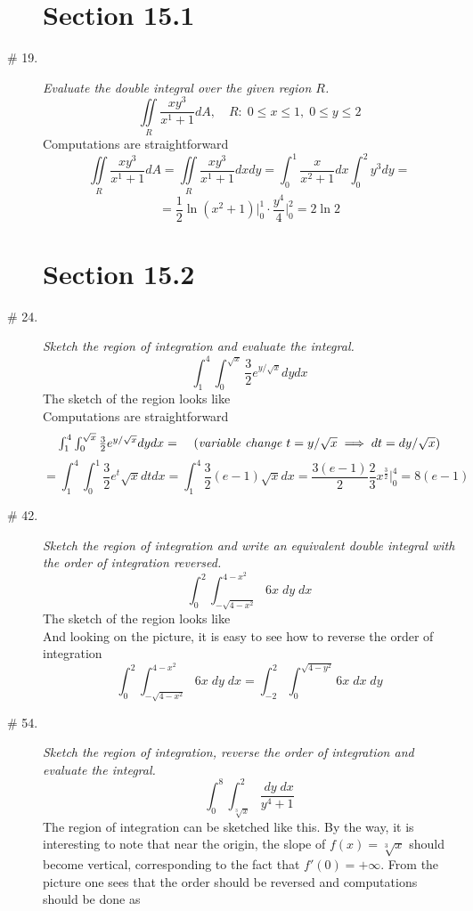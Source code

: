 \documentclass[8pt]{article} %
\begin{document}
\begin{description}
\section{Section 15.1}
	\item[\# 19.]{{\it Evaluate the double integral over the given region $R$.}
		\[\iint\limits_R \frac{xy^3}{x^1+1}dA,\quad R:\;0\leq x\leq1,\;0\leq y\leq2\]
		Computations are straightforward
		\[\iint\limits_R \frac{xy^3}{x^1+1}dA=\iint\limits_R \frac{xy^3}{x^1+1}dxdy=\int_0^1\frac{x}{x^2+1}dx\int_0^2y^3dy=\]
		\[=\frac{1}{2}\ln(x^2+1)\bigg|_0^1\cdot \frac{y^4}{4}\bigg|_0^2=2\ln2\]
		}
\section{Section 15.2}
\newcommand{\dx}{\;dx}
\newcommand{\dy}{\;dy}
\newcommand{\dz}{\;dz}
	\item[\# 24.]{{\it Sketch the region of integration and evaluate the integral.}
		\[\int_1^4\int_0^{\sqrt{x}}\frac{3}{2}e^{y/\sqrt{x}}dydx\]
		The sketch of the region looks like\\
		Computations are straightforward
		\[\begin{array}{rr}
		\int_1^4\int_0^{\sqrt{x}}\frac{3}{2}e^{y/\sqrt{x}}dydx=&\mbox{ (\textit{variable change $t=y/\sqrt{x}\implies dt=dy/\sqrt{x}$})}\\
		\end{array}\]
		\[=\int_1^4\int_0^1\frac{3}{2}e^{t}\sqrt{x}dtdx=\int_1^4\frac{3}{2}(e-1)\sqrt{x}dx=\frac{3(e-1)}{2}\frac{2}{3}x^{\frac{3}{2}}\bigg|_0
		^4=8(e-1)\]
		}
	\item[\# 42.]{{\it Sketch the region of integration and write an equivalent double integral with the order of integration reversed.}
		\[\int_0^2\int_{-\sqrt{4-x^2}}^{4-x^2}6x\dy\dx\]
		The sketch of the region looks like\\
		And looking on the picture, it is easy to see how to reverse the order of integration
		\[\int_0^2\int_{-\sqrt{4-x^2}}^{4-x^2}6x\dy\dx=\int_{-2}^2\int_0^{\sqrt{4-y^2}}6x\dx\dy\]
		}
	\item[\# 54.]{{\it Sketch the region of integration, reverse the order of integration and evaluate the integral.}
		\[\int_0^8\int_{\sqrt[3]{x}}^2\frac{\dy\dx}{y^4+1}\]
		The region of integration can be sketched like this.
		By the way, it is interesting to note that near the origin, the slope of $f(x)=\sqrt[3]{x}$ should become vertical, corresponding 
		to the fact that $f'(0)=+\infty$. From the picture one sees that the order should be reversed and computations should be done as
}
\end{description}
\end{document}
